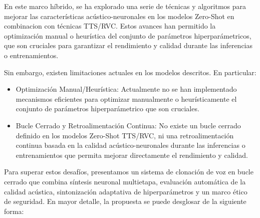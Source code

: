 \documentclass[conference]{IEEEtran}
\begin{document}
\cite{zhang2025minimax}

En este marco híbrido, se ha explorado una serie de técnicas y algoritmos para mejorar las características acústico-neuronales en los modelos Zero-Shot en combinacion con técnicas TTS/RVC. Estos avances han permitido la optimización manual o heurística del conjunto de parámetros hiperparámetricos, que son cruciales para garantizar el rendimiento y calidad durante las inferencias o entrenamientos.

Sin embargo, existen limitaciones actuales en los modelos descritos. En particular:

\begin{itemize}
	\item Optimización Manual/Heurística: Actualmente no se han implementado mecanismos eficientes para optimizar manualmente o heurísticamente el conjunto de parámetros hiperparámetrico que son cruciales.
	
	\item Bucle Cerrado y Retroalimentación Continua: No existe un bucle cerrado definido en los modelos Zero-Shot TTS/RVC, ni una retroalimentación continua basada en la calidad acústico-neuronales durante las inferencias o entrenamientos que permita mejorar directamente el rendimiento y calidad.
\end{itemize}

Para superar estos desafíos, presentamos un sistema de clonación de voz en bucle cerrado que combina síntesis neuronal multietapa, evaluación automática de la calidad acústica, sintonización adaptativa de hiperparámetros y un marco ético de seguridad. En mayor detalle, la propuesta se puede desglosar de la siguiente forma:
\end{document}
